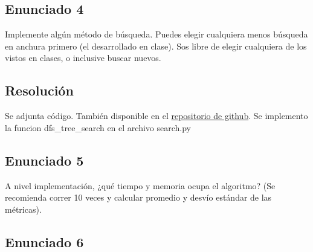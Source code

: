\documentclass[12pt]{article}
\begin{document}
%

\subsection*{Enunciado 4}
        
Implemente algún método de búsqueda. Puedes elegir cualquiera menos búsqueda en anchura primero (el desarrollado 
en clase). Sos libre de elegir cualquiera de los vistos en clases, o inclusive buscar nuevos.
\subsection*{Resolución}
\vspace{0.1in}

Se adjunta código. También disponible en el \href{https://github.com/LeoCenturion/ceia-intro-ia}{repositorio de github}.
Se implemento la funcion dfs\_tree\_search en el archivo search.py
\newpage

%

\subsection*{Enunciado 5}

A nivel implementación, ¿qué tiempo y memoria ocupa el algoritmo? (Se recomienda correr 10 veces y calcular 
promedio y desvío estándar de las métricas).


\subsection*{Enunciado 6}
\end{document}

